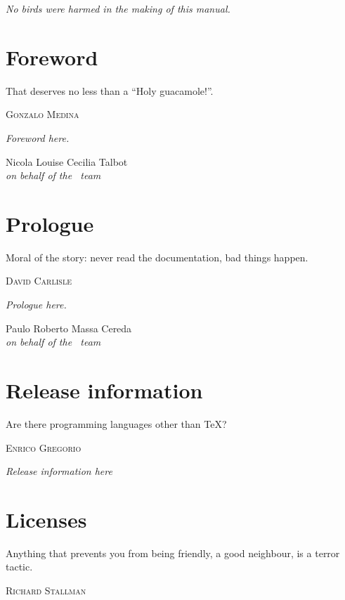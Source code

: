 \documentclass[a4paper,twoside,12pt]{memoir}
\begin{document}
\vspace*{25em}

\begin{flushright}
\em No birds were harmed in the making of this manual.
\end{flushright}

\chapter*{Foreword}
\label{chap:foreword}

\epigraph{That deserves no less than a ``Holy guacamole!''.}{\textsc{Gonzalo Medina}}

\emph{Foreword here.}

\vfill

\begin{flushright}
Nicola Louise Cecilia Talbot\\
\emph{on behalf of the \arara\ team}
\end{flushright}

\chapter*{Prologue}
\label{chap:prologue}

\epigraph{Moral of the story: never read the
documentation, bad things happen.}{\textsc{David Carlisle}}

\emph{Prologue here.}

\vfill

\begin{flushright}
Paulo Roberto Massa Cereda\\
\emph{on behalf of the \arara\ team}
\end{flushright}

\chapter*{Release information}
\label{chap:releaseinformation}

\epigraph{Are there programming languages other
than \TeX?}{\textsc{Enrico Gregorio}}

\emph{Release information here}

\chapter*{Licenses}
\label{chap:license}

\epigraph{Anything that prevents you from being friendly,
a good neighbour, is a terror tactic.}{\textsc{Richard
Stallman}}
\end{document}
